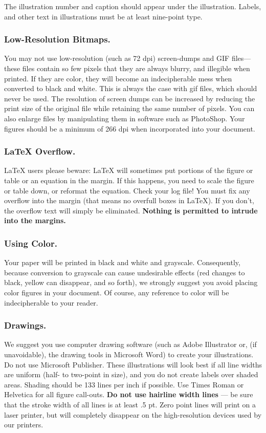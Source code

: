 \documentclass[letterpaper]{article}
\begin{document}
The illustration number and caption should appear under the illustration. Labels, and other text in illustrations must be at least nine-point type. 

\subsubsection{Low-Resolution Bitmaps.}
You may not use low-resolution (such as 72 dpi) screen-dumps and GIF files---these files contain so few pixels that they are always blurry, and illegible when printed. If they are color, they will become an indecipherable mess when converted to black and white. This is always the case with gif files, which should never be used. The resolution of screen dumps can be increased by reducing the print size of the original file while retaining the same number of pixels. You can also enlarge files by manipulating them in software such as PhotoShop. Your figures should be a minimum of 266 dpi when incorporated into your document.

\subsubsection{\LaTeX{} Overflow.}
\LaTeX{} users please beware: \LaTeX{} will sometimes put portions of the figure or table or an equation in the margin. If this happens, you need to scale the figure or table down, or reformat the equation. Check your log file! You must fix any overflow into the margin (that means no overfull boxes in \LaTeX{}). If you don't, the overflow text will simply be eliminated. \textbf{Nothing is permitted to intrude into the margins.}

\subsubsection{Using Color.}
Your paper will be printed in black and white and grayscale. Consequently, because conversion to grayscale can cause undesirable effects (red changes to black, yellow can disappear, and so forth), we strongly suggest you avoid placing color figures in your document. Of course, any reference to color will be indecipherable to your reader. 

\subsubsection{Drawings.}
We suggest you use computer drawing software (such as Adobe Illustrator or, (if unavoidable), the drawing tools in Microsoft Word) to create your illustrations. Do not use Microsoft Publisher. These illustrations will look best if all line widths are uniform (half- to two-point in size), and you do not create labels over shaded areas. Shading should be 133 lines per inch if possible. Use Times Roman or Helvetica for all figure call-outs. \textbf{Do not use hairline width lines} --- be sure that the stroke width of all lines is at least .5 pt. Zero point lines will print on a laser printer, but will completely disappear on the high-resolution devices used by our printers.
\end{document}
